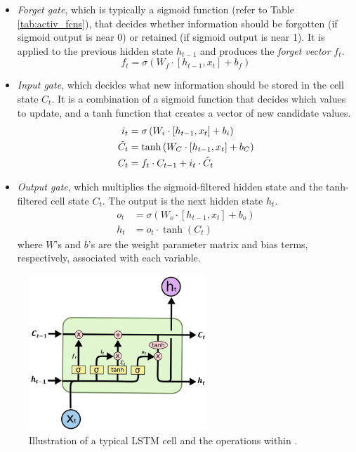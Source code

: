 \begin{itemize}
    \item \emph{Forget gate}, which is typically a sigmoid function (refer to Table \ref{tab:activ_fcns}), that decides whether information should be forgotten (if sigmoid output is near 0) or retained (if sigmoid output is near 1). It is applied to the previous hidden state $h_{t-1}$ and produces the \emph{forget vector} $f_t$.
    \begin{equation}
        f_t = \sigma \left(W_f\cdot \left[h_{t-1},x_t\right]+b_f\right)
    \end{equation}
    \item \emph{Input gate}, which decides what new information should be stored in the cell state $C_t$. It is a combination of a sigmoid function that decides which values to update, and a tanh function that creates a vector of new candidate values.
    \begin{equation}
        \begin{split}
            i_t & = \sigma \left(W_i\cdot \left[h_{t-1},x_t\right]+b_i\right) \\
            \Tilde{C}_t & = \tanh\left(W_C\cdot \left[h_{t-1},x_t\right]+b_C\right) \\
            C_t & = f_t\cdot C_{t-1} + i_t \cdot \Tilde{C}_t
        \end{split}
    \end{equation}
    \item \emph{Output gate}, which multiplies the sigmoid-filtered hidden state and the tanh-filtered cell state $C_t$. The output is the next hidden state $h_t$. 
    \begin{equation}
        \begin{split}
            o_t & = \sigma \left(W_o\cdot \left[h_{t-1},x_t\right]+b_o\right) \\
            h_t & = o_t \cdot \tanh(C_t)
        \end{split}
    \end{equation}
    where $W$'s and $b$'s are the weight parameter matrix and bias terms, respectively, associated with each variable.
\end{itemize}

\begin{figure}[b!]
    \centering
    \includegraphics[width=0.6\textwidth]{figures/lstm.png}
    \caption{Illustration of a typical LSTM cell and the operations within \cite{lstm_olah}.}
    \label{fig:lstm}
\end{figure}

